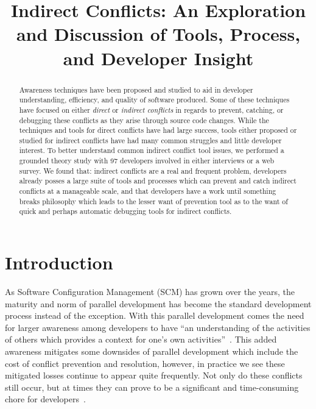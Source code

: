 \documentclass[conference]{IEEEtran}
\begin{document}
\title{Indirect Conflicts: An Exploration and Discussion of Tools, Process, and Developer Insight}

\author{
}

\maketitle

\begin{abstract}

Awareness techniques have been proposed and studied to aid in developer
understanding, efficiency, and quality of software produced. Some of these techniques have focused 
on either \textit{direct} or 
\textit{indirect conflicts} in regards to prevent, catching, or debugging these conflicts as they arise
through source code changes. While the techniques and tools for direct conflicts have had
large success, tools either proposed or studied for indirect conflicts have had many common
struggles and little developer interest. To better understand common indirect conflict tool issues, 
we performed a grounded theory study with 97 developers involved in either
interviews or a web survey. We found that: indirect conflicts are a real and frequent problem,
developers already posses a large suite of tools and processes which can prevent and catch
indirect conflicts at a manageable scale, and that developers have a work until something breaks philosophy
which leads to the lesser want of prevention tool as to the want of quick and perhaps automatic debugging tools
for indirect conflicts.

\end{abstract}

\section{Introduction}
\label{sec:intro}

As Software Configuration Management (SCM) has grown over the years, the maturity and norm of parallel 
development has become the standard development process instead of the exception. With this parallel development
comes the need for larger awareness among developers to have ``an understanding of the activities of others
which provides a context for one's own activities''~\cite{Dourish:1992:ACS}. This added awareness
mitigates some downsides of parallel development which include the cost of conflict prevention and resolution, however,
in practice we see these mitigated losses continue to appear quite frequently. Not only do these conflicts still occur,
but at times they can prove to be a significant and time-consuming chore for developers~\cite{Perry:2001:PCL}.
\end{document}
